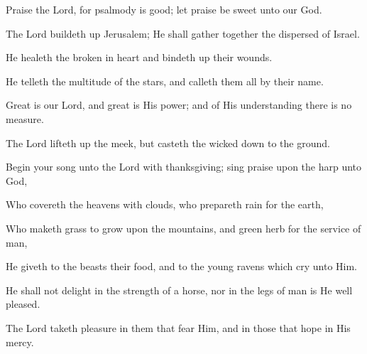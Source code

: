 Praise the Lord, for psalmody is good; let praise be sweet unto our God.

The Lord buildeth up Jerusalem; He shall gather together the dispersed of Israel.

He healeth the broken in heart and bindeth up their wounds.

He telleth the multitude of the stars, and calleth them all by their name.

Great is our Lord, and great is His power; and of His understanding there is no measure.

The Lord lifteth up the meek, but casteth the wicked down to the ground.

Begin your song unto the Lord with thanksgiving; sing praise upon the harp unto God,

Who covereth the heavens with clouds, who prepareth rain for the earth,

Who maketh grass to grow upon the mountains, and green herb for the service of man,

He giveth to the beasts their food, and to the young ravens which cry unto Him.

He shall not delight in the strength of a horse, nor in the legs of man is He well pleased.

The Lord taketh pleasure in them that fear Him, and in those that hope in His mercy.
